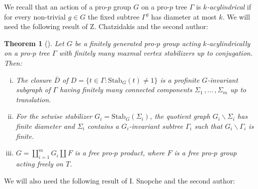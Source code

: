 \documentclass[a4paper]{amsart}
\newtheorem{thm}{Theorem}[section]
\newtheorem{lem}[thm]{Lemma}
\theoremstyle{definition}
\begin{document}
We recall that an action of a pro-\(p\) group \(G\) on a pro-\(p\) tree \(\Gamma\) is \emph{\(k\)-acylindrical} if for every non-trivial \(g \in G\) the fixed subtree \(\Gamma^g\) has diameter at most \(k\). We will need the following result of Z. Chatzidakis and the second author:

\begin{thm}[{\cite[Thm. 5.4]{chatzidakisPropGroupsActing2022}}]\label{thm-chatzidakis} Let \(G\) be a finitely generated pro-\(p\) group acting \(k\)-acylindrically on a pro-\(p\) tree \(\Gamma\) with finitely many maxmal vertex stabilizers up to conjugation. Then:
\begin{enumerate}[(i)]
    \item The closure \(\overline{D}\) of \(D = \{t \in \Gamma\colon \mathrm{Stab}_G(t) \neq 1\}\) is a profinite \(G\)-invariant subgraph of \(\Gamma\) having finitely many connected components \(\Sigma_1\,,\ldots\,,\Sigma_m\) up to translation.
    \item For the setwise stabilizer \(G_i = \mathrm{Stab}_G(\Sigma_i)\), the quotient graph \(G_i\backslash \Sigma_i\) has finite diameter and \(\Sigma_i\) contains a \(G_i\)-invariant subtree \(\Gamma_i\) such that \(G_i\backslash \Gamma_i\) is finite.
    \item \(G = \coprod_{i=1}^m G_i \amalg F\) is a free pro-\(p\) product, where \(F\) is a free pro-\(p\) group acting freely on \(T\).
\end{enumerate}
\end{thm}

We will also need the following result of I. Snopche and the second author:

\end{document}
